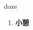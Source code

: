 
\begin{frame}
{\huge doze}
\begin{center}
\begin{enumerate}\Large
  \item \textbf{小憩}
\end{enumerate}
\end{center}
\end{frame}

